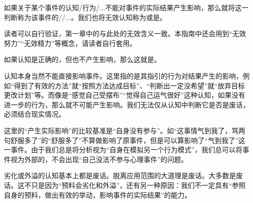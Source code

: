 如果关于某个事件的认知/行为/...不能对事件的实际结果产生影响，那么就将这一判断称为该事件的//...。我们也将无效认知称为或是。
\begin{explain}
读者可以自行验证，第一章中的与此处的无效含义一致。本指南中还会用到“无效努力”“无效精力”等概念，请读者自行套用。

如果认知是正确的，但也不产生影响，那么这就是。

认知本身当然不能直接影响事件。这里指的是其指引的行为对结果产生的影响，例如“得到了有效的方法”就“按照方法达成目标”、“判断出一定没希望”就“放弃目标更改计划”等。而像是“感觉自己受摆布”“觉得自己运气很好”这种认知，如果没有进一步的行为，那么就不可能产生影响。我们无法仅从认知中判断它是否是废话，必须结合现实情况。

这里的“产生实际影响”的比较基准是“自身没有参与”。如“这事情气到我了，骂两句舒服多了”的“舒服多了”不算做影响了原事件，但是可以算影响了“气到我了”这一事件。由于我们总是将分析视为“自身在模拟另一个行为模式”，我们总可以将事件视为外部的，不会出现“自己没法不参与心理事件”的问题。

劣化或外溢的认知基本上都是废话。脱离应用范围的大道理是废话。大多数是废话。这不只是因为“预料会劣化和外溢”，还有另一种原因：我们不一定具有“参照自身的预料，做出有效的举动，影响事件的实际结果”的能力。
\end{explain}

